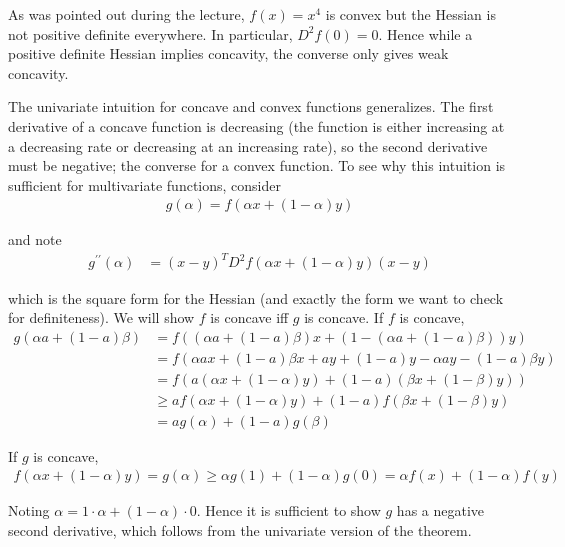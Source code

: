 \documentclass{article}
\begin{document}
\begin{remark}
  As was pointed out during the lecture, $f(x) = x^4$ is convex but the Hessian is not positive definite everywhere. In particular, $D^2 f(0) = 0$. Hence while a positive definite Hessian implies concavity, the converse only gives weak concavity.
\end{remark}

\begin{remark}
  The univariate intuition for concave and convex functions generalizes. The first derivative of a concave function is decreasing (the function is either increasing at a decreasing rate or decreasing at an increasing rate), so the second derivative must be negative; the converse for a convex function. To see why this intuition is sufficient for multivariate functions, consider
  \begin{align*}
    g(\alpha) = f(\alpha x + (1 - \alpha) y)
  \end{align*}

  and note
  \begin{align*}
    g^{\prime\prime}(\alpha) & = (x - y)^T D^2 f(\alpha x + (1 - \alpha) y) (x - y)
  \end{align*}

  which is the square form for the Hessian (and exactly the form we want to check for definiteness). We will show $f$ is concave iff $g$ is concave. If $f$ is concave,
  \begin{align*}
    g(\alpha a + (1 - a) \beta)
    &
    =
    f((\alpha a + (1 - a) \beta) x + (1 - (\alpha a + (1 - a) \beta)) y)
    \\
    &
    =
    f\left(
      \alpha a x + 
      (1 - a) \beta x 
      +
      a y
      +
      (1 - a) y
      - 
      \alpha a y 
      - 
      (1 - a) \beta y
    \right)
    \\
    &
    =
    f\left(
      a (\alpha x + (1 - \alpha) y)
      +
      (1 - a) (\beta x + (1 - \beta) y)
    \right)
    \\
    &
    \ge
    a 
    f(\alpha x + (1 - \alpha) y)
    +
    (1 - a) f(\beta x + (1 - \beta) y)
    \\
    &
    =
    a g(\alpha) + (1 - a) g(\beta)
  \end{align*}

  If $g$ is concave,
  \begin{align*}
    f(\alpha x + (1 - \alpha) y) = g(\alpha) \ge \alpha g(1) + (1 - \alpha) g(0) = \alpha f(x) + (1 - \alpha) f(y)
  \end{align*}

  Noting $\alpha = 1 \cdot\alpha + (1 - \alpha) \cdot 0$. Hence it is sufficient to show $g$ has a negative second derivative, which follows from the univariate version of the theorem.
\end{remark}
\end{document}
